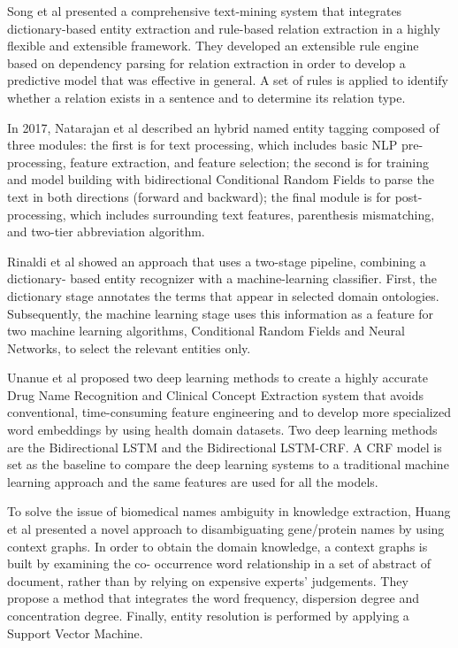 \documentclass[]{book}
\theoremstyle{definition}
\theoremstyle{definition}
\theoremstyle{definition}
\theoremstyle{remark}
\begin{document}
Song et al \citep{song2015pkde4j} presented a comprehensive text-mining
system that integrates dictionary-based entity extraction and rule-based
relation extraction in a highly flexible and extensible framework. They
developed an extensible rule engine based on dependency parsing for
relation extraction in order to develop a predictive model that was
effective in general. A set of rules is applied to identify whether a
relation exists in a sentence and to determine its relation type.

In 2017, Natarajan et al \citep{murugesan2017bcc} described an hybrid
named entity tagging composed of three modules: the first is for text
processing, which includes basic NLP pre-processing, feature extraction,
and feature selection; the second is for training and model building
with bidirectional Conditional Random Fields to parse the text in both
directions (forward and backward); the final module is for
post-processing, which includes surrounding text features, parenthesis
mismatching, and two-tier abbreviation algorithm.

Rinaldi et al \citep{basaldella2017entity} showed an approach that uses
a two-stage pipeline, combining a dictionary- based entity recognizer
with a machine-learning classifier. First, the dictionary stage
annotates the terms that appear in selected domain ontologies.
Subsequently, the machine learning stage uses this information as a
feature for two machine learning algorithms, Conditional Random Fields
and Neural Networks, to select the relevant entities only.

Unanue et al \citep{unanue2017recurrent} proposed two deep learning
methods to create a highly accurate Drug Name Recognition and Clinical
Concept Extraction system that avoids conventional, time-consuming
feature engineering and to develop more specialized word embeddings by
using health domain datasets. Two deep learning methods are the
Bidirectional LSTM and the Bidirectional LSTM-CRF. A CRF model is set as
the baseline to compare the deep learning systems to a traditional
machine learning approach and the same features are used for all the
models.

To solve the issue of biomedical names ambiguity in knowledge
extraction, Huang et al \citep{huang2018novel} presented a novel
approach to disambiguating gene/protein names by using context graphs.
In order to obtain the domain knowledge, a context graphs is built by
examining the co- occurrence word relationship in a set of abstract of
document, rather than by relying on expensive experts' judgements. They
propose a method that integrates the word frequency, dispersion degree
and concentration degree. Finally, entity resolution is performed by
applying a Support Vector Machine.
\end{document}
